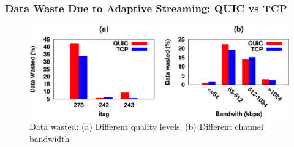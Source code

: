 \subsubsection{Data Waste Due to Adaptive Streaming: QUIC vs TCP}

\begin{figure}[!t]
	\captionsetup[subfigure]{}
	\begin{center}
        \includegraphics[width=0.9\linewidth]{img/plotdata/CDF/downloaded/data_wasted_itag_bw}
		\caption{\label{fig:data_wasted}Data wasted: (a) Different quality levels, (b) Different channel bandwidth}
	\end{center}
\end{figure}



%


